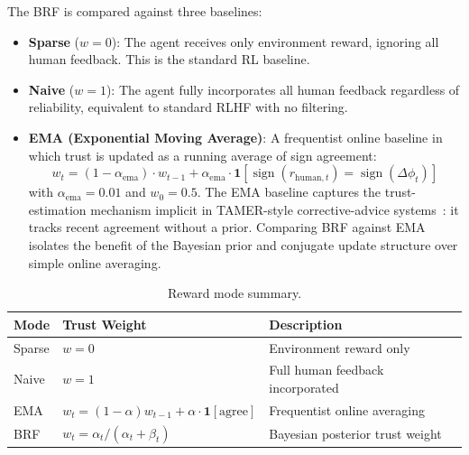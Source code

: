 \documentclass[11pt]{article}
\begin{document}
The BRF is compared against three baselines:
\begin{itemize}
  \item \textbf{Sparse} ($w = 0$): The agent receives only environment reward,
        ignoring all human feedback. This is the standard RL baseline.
  \item \textbf{Naive} ($w = 1$): The agent fully incorporates all human
        feedback regardless of reliability, equivalent to standard RLHF with
        no filtering.
  \item \textbf{EMA (Exponential Moving Average)}: A frequentist online
        baseline in which trust is updated as a running average of sign
        agreement:
        \begin{equation}
          w_t = (1 - \alpha_{\mathrm{ema}}) \cdot w_{t-1}
                + \alpha_{\mathrm{ema}} \cdot \mathbf{1}
                  \!\left[\operatorname{sign}(r_{\mathrm{human},t})
                   = \operatorname{sign}(\Delta\phi_t)\right]
          \label{eq:ema}
        \end{equation}
        with $\alpha_{\mathrm{ema}} = 0.01$ and $w_0 = 0.5$. The EMA baseline
        captures the trust-estimation mechanism implicit in TAMER-style
        corrective-advice systems~\cite{knox2009interactively}: it tracks
        recent agreement without a prior. Comparing BRF against EMA isolates
        the benefit of the Bayesian prior and conjugate update structure over
        simple online averaging.
\end{itemize}

\begin{table}[H]
  \centering
  \caption{Reward mode summary.}
  \label{tab:modes}
  \begin{tabular}{@{}lll@{}}
    \toprule
    Mode  & Trust Weight                          & Description                            \\
    \midrule
    Sparse & $w = 0$                              & Environment reward only                \\
    Naive  & $w = 1$                              & Full human feedback incorporated       \\
    EMA    & $w_t = (1{-}\alpha)w_{t-1} + \alpha \cdot \mathbf{1}[\text{agree}]$
                                                  & Frequentist online averaging           \\
    BRF    & $w_t = \alpha_t / (\alpha_t+\beta_t)$ & Bayesian posterior trust weight       \\
    \bottomrule
  \end{tabular}
\end{table}
\end{document}
